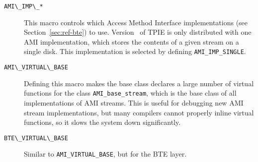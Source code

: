 \begin{description}
\item[{\verb|AMI\_IMP\_*|}] This macro controls which Access Method
Interface implementations (see Section~\ref{sec:ref-bte}) to use. Version
\version~of TPIE is only distributed with one AMI implementation, which stores
the contents of a given stream on a single disk. This implementation is
selected by defining \verb|AMI_IMP_SINGLE|.


\item[{\verb|AMI\_VIRTUAL\_BASE|}] Defining this macro makes the base class
declares a large number of virtual functions for the class
\verb|AMI_base_stream|, which is the base class of all implementations of
AMI streams. This is useful for debugging new AMI stream implementations,
but many compilers cannot properly inline virtual functions, so it slows
the system down significantly.


\item[{\verb|BTE\_VIRTUAL\_BASE|}] Similar to \verb|AMI_VIRTUAL_BASE|, but
for the BTE layer.
  

%
%



\end{description}
